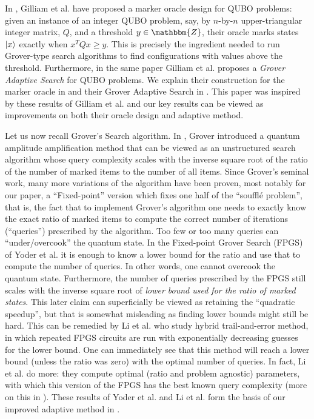\documentclass[reqno, 10pt]{amsart}
\numberwithin{equation}{section}                     %
\def\Z{\mathbbm{Z}}
\begin{document}
\smallskip

In \cite{gilliam_grover_2021}, Gilliam et al. have proposed a marker oracle design for QUBO problems: given an instance of an integer QUBO problem, say, by $n$-by-$n$ upper-triangular integer matrix, $Q$, and a threshold $y \in \Z$, their oracle marks states $\ket{x}$ exactly when $x^T Q x \geqslant y$. This is precisely the ingredient needed to run Grover-type search algorithms to find configurations with values above the threshold. Furthermore, in the same paper Gilliam et al. proposes a \emph{Grover Adaptive Search} for QUBO problems. We explain their construction for the marker oracle in  and their Grover Adaptive Search in . This paper was inspired by these results of Gilliam et al. and our key results can be viewed as improvements on both their oracle design and adaptive method.

Let us now recall Grover's Search algorithm. In \cite{grover_quantum_97}, Grover introduced a quantum amplitude amplification method that can be viewed as an unstructured search algorithm whose query complexity scales with the inverse square root of the ratio of the number of marked items to the number of all items. Since Grover's seminal work, many more variations of the algorithm have been proven, most notably for our paper, a ``Fixed-point'' version which fixes one half of the ``souffl\'e problem'', that is, the fact that to implement Grover's algorithm one needs to exactly know the exact ratio of marked items to compute the correct number of iterations (``queries'') prescribed by the algorithm. Too few or too many queries can ``under/overcook'' the quantum state. In the Fixed-point Grover Search (FPGS) of Yoder et al. \cite{yoder_fixed_2014} it is enough to know a lower bound for the ratio and use that to compute the number of queries. In other words, one cannot overcook the quantum state. Furthermore, the number of queries prescribed by the FPGS still scales with the inverse square root of \emph{lower bound used for the ratio of marked states}. This later claim can superficially be viewed as retaining the ``quadratic speedup'', but that is somewhat misleading as finding lower bounds might still be hard. This can be remedied by Li et al. \cite{li_quantum_2019} who study hybrid trail-and-error method, in which repeated FPGS circuits are run with exponentially decreasing guesses for the lower bound. One can immediately see that this method will reach a lower bound (unless the ratio was zero) with the optimal number of queries. In fact, Li et al. do more: they compute optimal (ratio and problem agnostic) parameters, with which this version of the FPGS has the best known query complexity (more on this in ). These results of Yoder et al. and Li et al. form the basis of our improved adaptive method in .
\end{document}
